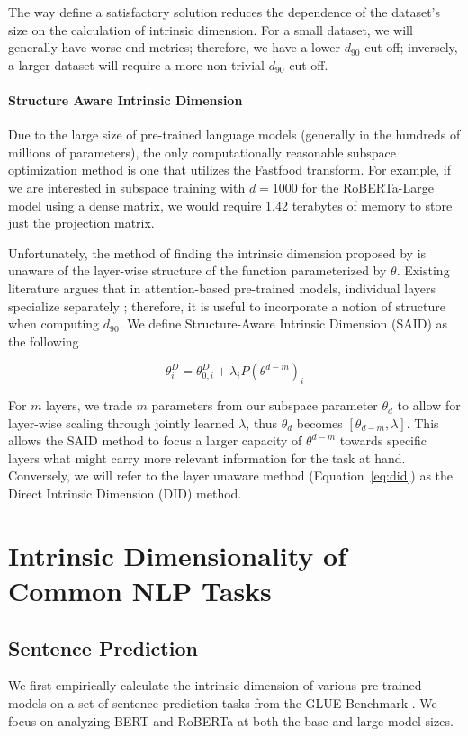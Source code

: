 The way \cite{intrinsic_dimension} define a satisfactory solution reduces the dependence of the dataset's size on the calculation of intrinsic dimension. For a small dataset, we will generally have worse end metrics; therefore, we have a lower $d_{90}$ cut-off; inversely, a larger dataset will require a more non-trivial $d_{90}$ cut-off.
\paragraph{Structure Aware Intrinsic Dimension}

Due to the large size of pre-trained language models (generally in the hundreds of millions of parameters), the only computationally reasonable subspace optimization method is one that utilizes the Fastfood transform. For example, if we are interested in subspace training with $d=1000$ for the RoBERTa-Large model using a dense matrix, we would require 1.42 terabytes of memory to store just the projection matrix.

Unfortunately, the method of finding the intrinsic dimension proposed by \cite{intrinsic_dimension} is unaware of the layer-wise structure of the function parameterized by $\theta$. Existing literature argues that in attention-based pre-trained models, individual layers specialize separately \citep{what_does_bert_look_at}; therefore, it is useful to incorporate a notion of structure when computing $d_{90}$. We define Structure-Aware Intrinsic Dimension (SAID) as the following

\begin{equation}
    \theta^{D}_i = \theta^{D}_{0, i} + \lambda_i P(\theta^{d-m})_i
\end{equation}

For $m$ layers, we trade $m$ parameters from our subspace parameter $\theta_d$ to allow for layer-wise scaling through jointly learned $\lambda$, thus $\theta_d$ becomes $\left[\theta_{d-m}, \lambda\right]$. This allows the SAID method to focus a larger capacity of $\theta^{d-m}$ towards specific layers what might carry more relevant information for the task at hand. Conversely, we will refer to the layer unaware method (Equation~\ref{eq:did}) as the Direct Intrinsic Dimension (DID) method.

\section{Intrinsic Dimensionality of Common NLP Tasks}
\label{sec:mes}

\subsection{Sentence Prediction} We first empirically calculate the intrinsic dimension of various pre-trained models on a set of sentence prediction tasks from the GLUE Benchmark \citep{GLUE}. We focus on analyzing BERT \citep{BERT} and RoBERTa \citep{ROBERTA} at both the base and large model sizes.

